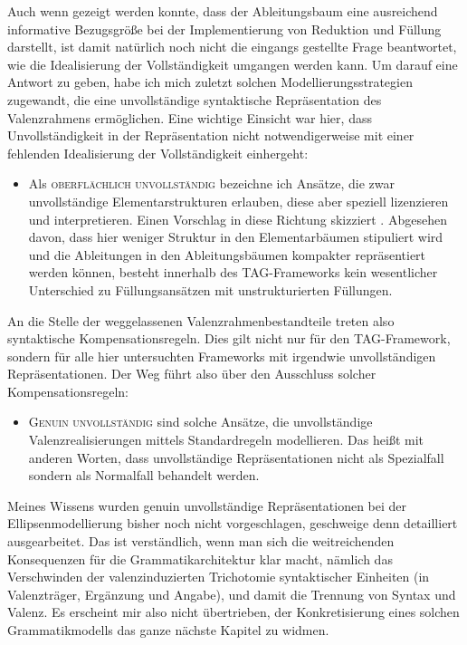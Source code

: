 Auch wenn gezeigt werden konnte, dass der Ableitungsbaum eine ausreichend informative Bezugsgröße bei der Implementierung von Reduktion und Füllung darstellt, ist damit natürlich noch nicht die eingangs gestellte Frage beantwortet, wie die Idealisierung der Vollständigkeit umgangen werden kann. Um darauf eine Antwort zu geben, habe ich mich zuletzt solchen Modellierungsstrategien zugewandt, die eine unvollständige syntaktische Repräsentation des Valenzrahmens ermöglichen. Eine wichtige Einsicht war hier, dass Unvollständigkeit in der Repräsentation nicht notwendigerweise mit einer fehlenden Idealisierung der Vollständigkeit einhergeht:
\begin{itemize}
  \item Als \textsc{oberflächlich unvollständig} bezeichne ich Ansätze, die zwar unvollständige Elementarstrukturen erlauben, diese aber speziell lizenzieren und interpretieren. Einen Vorschlag in diese Richtung skizziert \cite{Sarkar:97}. Abgesehen davon, dass hier weniger Struktur in den Elementarbäumen stipuliert wird und die Ableitungen in den Ableitungsbäumen kompakter repräsentiert werden können, besteht innerhalb des TAG-Frameworks kein wesentlicher Unterschied zu Füllungsansätzen mit unstrukturierten Füllungen.
\end{itemize}  
An die Stelle der weggelassenen Valenzrahmenbestandteile treten also syntaktische Kompensationsregeln. Dies gilt nicht nur für den TAG-Framework, sondern für alle hier untersuchten Frameworks mit irgendwie unvollständigen Repräsentationen. Der Weg führt also über den Ausschluss solcher Kompensationsregeln: 
\begin{itemize}   
  \item \textsc{Genuin unvollständig} sind solche Ansätze, die unvollständige Valenzrealisierungen mittels Standardregeln modellieren. Das heißt mit anderen Worten, dass unvollständige Repräsentationen nicht als Spezialfall sondern als Normalfall behandelt werden. 
\end{itemize}
Meines Wissens wurden genuin unvollständige Repräsentationen bei der Ellipsenmodellierung bisher noch nicht vorgeschlagen, geschweige denn detailliert ausgearbeitet. Das ist verständlich, wenn man sich die weitreichenden  Konsequenzen für die Grammatikarchitektur klar macht, nämlich das Verschwinden der valenzinduzierten  Trichotomie syntaktischer Einheiten (in Valenzträger, Ergänzung und Angabe), und damit die Trennung von Syntax und Valenz. Es erscheint mir also nicht übertrieben, der Konkretisierung eines solchen Grammatikmodells das ganze nächste Kapitel zu widmen.



  